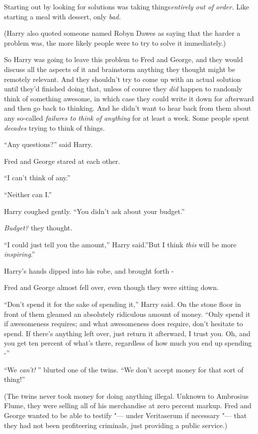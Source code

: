 Starting out by looking for solutions was taking things\emph{entirely
out of order.} Like starting a meal with dessert, only \emph{bad.}

(Harry also quoted someone named Robyn Dawes as saying that the harder a
problem was, the more likely people were to try to solve it
immediately.)

So Harry was going to leave this problem to Fred and George, and they
would discuss all the aspects of it and brainstorm anything they thought
might be remotely relevant. And they shouldn't try to come up with an
actual solution until they'd finished doing that, unless of course they
\emph{did} happen to randomly think of something awesome, in which case
they could write it down for afterward and then go back to thinking. And
he didn't want to hear back from them about any so-called \emph{failures
to think of anything} for at least a week. Some people spent
\emph{decades} trying to think of things.

``Any questions?'' said Harry.

Fred and George stared at each other.

``I can't think of any.''

``Neither can I.''

Harry coughed gently. ``You didn't ask about your budget.''

\emph{Budget?} they thought.

``I could just tell you the amount,'' Harry said.''But I think
\emph{this} will be more \emph{inspiring}.''

Harry's hands dipped into his robe, and brought forth -

Fred and George almost fell over, even though they were sitting down.

``Don't spend it for the sake of spending it,'' Harry said. On the stone
floor in front of them gleamed an absolutely ridiculous amount of money.
``Only spend it if awesomeness requires; and what awesomeness does
require, don't hesitate to spend. If there's anything left over, just
return it afterward, I trust you. Oh, and you get ten percent of what's
there, regardless of how much you end up spending -''

``We \emph{can't!} '' blurted one of the twins. ``We don't accept money
for that sort of thing!''

(The twins never took money for doing anything illegal. Unknown to
Ambrosius Flume, they were selling all of his merchandise at zero
percent markup. Fred and George wanted to be able to testify "--- under
Veritaserum if necessary "--- that they had not been profiteering
criminals, just providing a public service.)

